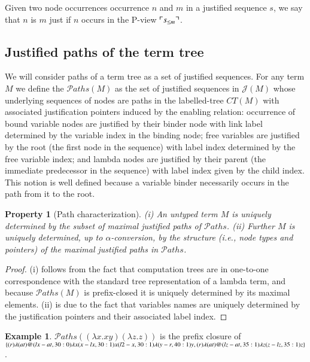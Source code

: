 \documentclass{elsarticle}
\makeatletter
\theoremstyle{plain}
\newtheorem{property}[theorem]{Property}
\theoremstyle{definition}
\newtheorem{example}{Example}[section]
\theoremstyle{remark}
\newcommand{\ctree}{CT} %
\newcommand\pathset{{\mathcal{P}aths}} %
\renewcommand\ie{{\it i.e.\@\xspace}}
\def\justseqset{\mathcal{J}}
\makeatother
\begin{document}
Given two node occurrences occurrence $n$ and $m$ in a justified sequence $s$, we say that $n$ is  $m$ just if $n$ occurs in the P-view $\ulcorner s_{\leq m} \urcorner$.

\subsection{Justified paths of the term tree}

We will consider paths of a term tree as a set of justified sequences. For any term $M$ we define the  $\pathset(M)$ as the set of justified sequences in $\justseqset(M)$ whose underlying sequences of nodes are paths in the labelled-tree $\ctree(M)$ with associated justification pointers induced by the enabling relation: occurrence of bound variable nodes are justified by their binder node with link label determined by the variable index in the binding node; free variables are justified by the root (the first node in the sequence) with label index determined by the free variable index; and lambda nodes are justified by their parent (the immediate predecessor in the sequence) with label index given by the child index. This notion is well defined because a variable binder necessarily occurs in the path from it to the root.
\begin{property}[Path characterization]
\label{prop:tree_path_charact}
(i) An untyped term $M$ is uniquely determined by the subset of maximal justified paths of $\pathset$.
(ii) Further $M$ is uniquely determined, up to $\alpha$-conversion, by the \emph{structure} (\ie, node types and pointers) of the maximal justified paths in $\pathset$.
\end{property}
\begin{proof}
(i) follows from the fact that computation trees are in one-to-one correspondence with the standard tree representation of a lambda term, and because $\pathset(M)$ is prefix-closed it is uniquely determined by its maximal elements. (ii) is due to the fact that variables names are uniquely determined by the justification pointers and their associated label index.
\end{proof}

\begin{example}
  $\pathset((\lambda x.x y) (\lambda z.z))$ is the prefix closure of
  $\{
  \Pstr{ (r){\lambda} (at){@} (lx-at,30:0){\lambda x} (x-lx,30:1){x} (l2-x,30:1){\lambda} (y-r,40:1){y} },
  \Pstr{ (r){\lambda} (at){@} (lz-at,35:1){\lambda z} (z-lz,35:1){z}}
  \}$.
\end{example}
\end{document}
